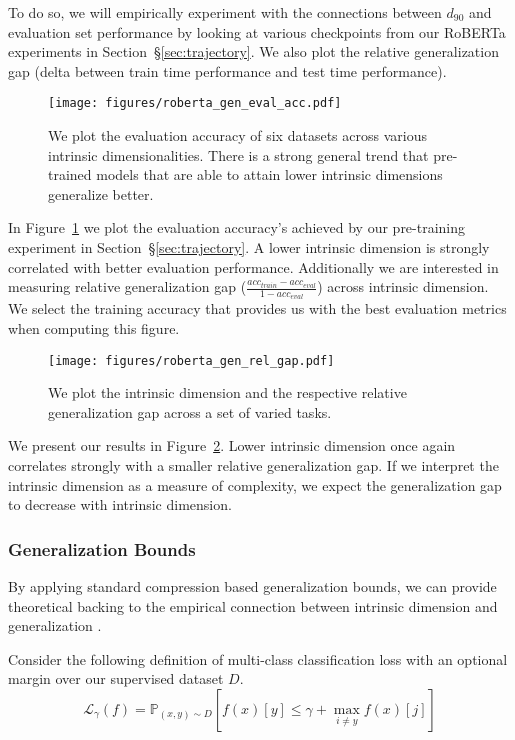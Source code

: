 \documentclass{article} \usepackage{iclr2020_conference,times}
\begin{document}
To do so, we will empirically experiment with the connections between $d_{90}$ and evaluation set performance by looking at various checkpoints from our RoBERTa experiments in Section~\S\ref{sec:trajectory}. We also plot the relative generalization gap (delta between train time performance and test time performance).


\begin{figure}
    \centering
    \texttt{[image: figures/roberta\_gen\_eval\_acc.pdf]}
    \caption{We plot the evaluation accuracy of six datasets across various intrinsic dimensionalities. There is a strong general trend that pre-trained models that are able to attain lower intrinsic dimensions generalize better.}
    \label{fig:roberta_gen_eval_acc}
\end{figure}

In Figure~\ref{fig:roberta_gen_eval_acc} we plot the evaluation accuracy's achieved by our pre-training experiment in Section~\S\ref{sec:trajectory}. A lower intrinsic dimension is strongly correlated with better evaluation performance. Additionally we are interested in measuring relative generalization gap ($\frac{acc_{train}-acc_{eval}}{1-acc_{eval}}$) across intrinsic dimension. We select the training accuracy that provides us with the best evaluation metrics when computing this figure. 
\begin{figure}
    \centering
    \texttt{[image: figures/roberta\_gen\_rel\_gap.pdf]}
    \caption{We plot the intrinsic dimension and the respective relative generalization gap across a set of varied tasks.}
    \label{fig:roberta_gen_rel_gap}
\end{figure}

We present our results in Figure~\ref{fig:roberta_gen_rel_gap}. Lower intrinsic dimension once again correlates strongly with a smaller relative generalization gap. If we interpret the intrinsic dimension as a measure of complexity, we expect the generalization gap to decrease with intrinsic dimension.

\subsubsection{Generalization Bounds}
By applying standard compression based generalization bounds, we can provide theoretical backing to the empirical connection between intrinsic dimension and generalization \citep{compression_generalization_gap}.

Consider the following definition of multi-class classification loss with an optional margin over our supervised dataset $D$. 
\begin{equation}
    \mathcal{L}_{\gamma}(f) = \mathbb{P}_{(x,y)\sim D}\left[f(x)[y] \le \gamma + \max_{i \ne y} f(x)[j] \right]
\end{equation}
\end{document}

